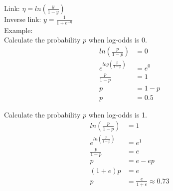 \documentclass[12pt]{article}
\begin{document}
Link: $\eta = ln(\frac{y}{1-y})$ \\
Inverse link: $y = \frac{1}{1+e^{-\eta}}$ \\

Example: \\

Calculate the probability $p$ when log-odds is 0. \\

\begin{equation*}
\begin{split}
ln(\frac{p}{1-p}) &= 0 \\
e^{log(\frac{p}{1-p})} &= e^0 \\
\frac{p}{1-p} &= 1 \\
p &= 1-p \\
p &= 0.5
\end{split}
\end{equation*}

Calculate the probability $p$ when log-odds is 1. \\

\begin{equation*}
\begin{split}
ln(\frac{p}{1-p}) &= 1 \\
e^{ln(\frac{p}{1-p})} &= e^1 \\
\frac{p}{1-p} &= e \\
p &= e-ep \\
(1+e)p &= e \\
p &= \frac{e}{1+e} \approx 0.73
\end{split}
\end{equation*}
\end{document}
